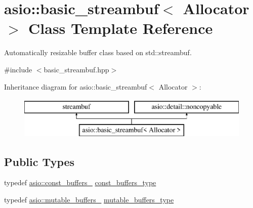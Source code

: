 \hypertarget{classasio_1_1basic__streambuf}{}\section{asio\+:\+:basic\+\_\+streambuf$<$ Allocator $>$ Class Template Reference}
\label{classasio_1_1basic__streambuf}


Automatically resizable buffer class based on std\+::streambuf.  




{\ttfamily \#include $<$basic\+\_\+streambuf.\+hpp$>$}

Inheritance diagram for asio\+:\+:basic\+\_\+streambuf$<$ Allocator $>$\+:\begin{figure}[H]
\begin{center}
\leavevmode
\includegraphics[height=2.000000cm]{classasio_1_1basic__streambuf}
\end{center}
\end{figure}
\subsection*{Public Types}
\begin{DoxyCompactItemize}
\item 
typedef \hyperlink{classasio_1_1const__buffers__1}{asio\+::const\+\_\+buffers\+\_} \hyperlink{classasio_1_1basic__streambuf_a6318f8e7cef616d25207918033f02bc9}{const\+\_\+buffers\+\_\+type}
\item 
typedef \hyperlink{classasio_1_1mutable__buffers__1}{asio\+::mutable\+\_\+buffers\+\_} \hyperlink{classasio_1_1basic__streambuf_a4d2090a05e1d13270b4e30d848517272}{mutable\+\_\+buffers\+\_\+type}
\end{DoxyCompactItemize}

